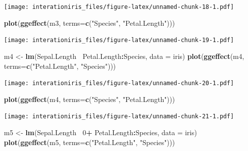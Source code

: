 \documentclass[]{book}
\newenvironment{Shaded}{\begin{snugshade}}{\end{snugshade}}
\newcommand{\KeywordTok}[1]{\textcolor[rgb]{0.13,0.29,0.53}{\textbf{#1}}}
\newcommand{\DataTypeTok}[1]{\textcolor[rgb]{0.13,0.29,0.53}{#1}}
\newcommand{\DecValTok}[1]{\textcolor[rgb]{0.00,0.00,0.81}{#1}}
\newcommand{\StringTok}[1]{\textcolor[rgb]{0.31,0.60,0.02}{#1}}
\newcommand{\OperatorTok}[1]{\textcolor[rgb]{0.81,0.36,0.00}{\textbf{#1}}}
\newcommand{\NormalTok}[1]{#1}
\begin{document}
\texttt{[image: interationiris\_files/figure-latex/unnamed-chunk-18-1.pdf]}

\begin{Shaded}
\begin{Highlighting}[]
\KeywordTok{plot}\NormalTok{(}\KeywordTok{ggeffect}\NormalTok{(m3, }\DataTypeTok{terms=}\KeywordTok{c}\NormalTok{(}\StringTok{"Species"}\NormalTok{, }\StringTok{"Petal.Length"}\NormalTok{)))}
\end{Highlighting}
\end{Shaded}

\texttt{[image: interationiris\_files/figure-latex/unnamed-chunk-19-1.pdf]}

\begin{Shaded}
\begin{Highlighting}[]
\NormalTok{m4 <-}\StringTok{ }\KeywordTok{lm}\NormalTok{(Sepal.Length}\OperatorTok{~}\StringTok{ }\NormalTok{Petal.Length}\OperatorTok{:}\NormalTok{Species, }\DataTypeTok{data =}\NormalTok{ iris)}
\KeywordTok{plot}\NormalTok{(}\KeywordTok{ggeffect}\NormalTok{(m4, }\DataTypeTok{terms=}\KeywordTok{c}\NormalTok{(}\StringTok{"Petal.Length"}\NormalTok{, }\StringTok{"Species"}\NormalTok{)))}
\end{Highlighting}
\end{Shaded}

\texttt{[image: interationiris\_files/figure-latex/unnamed-chunk-20-1.pdf]}

\begin{Shaded}
\begin{Highlighting}[]
\KeywordTok{plot}\NormalTok{(}\KeywordTok{ggeffect}\NormalTok{(m4, }\DataTypeTok{terms=}\KeywordTok{c}\NormalTok{(}\StringTok{"Species"}\NormalTok{, }\StringTok{"Petal.Length"}\NormalTok{)))}
\end{Highlighting}
\end{Shaded}

\texttt{[image: interationiris\_files/figure-latex/unnamed-chunk-21-1.pdf]}

\begin{Shaded}
\begin{Highlighting}[]
\NormalTok{m5 <-}\StringTok{ }\KeywordTok{lm}\NormalTok{(Sepal.Length}\OperatorTok{~}\StringTok{ }\DecValTok{0}\OperatorTok{+}\StringTok{ }\NormalTok{Petal.Length}\OperatorTok{:}\NormalTok{Species, }\DataTypeTok{data =}\NormalTok{ iris)}
\KeywordTok{plot}\NormalTok{(}\KeywordTok{ggeffect}\NormalTok{(m5, }\DataTypeTok{terms=}\KeywordTok{c}\NormalTok{(}\StringTok{"Petal.Length"}\NormalTok{, }\StringTok{"Species"}\NormalTok{)))}
\end{Highlighting}
\end{Shaded}
\end{document}
